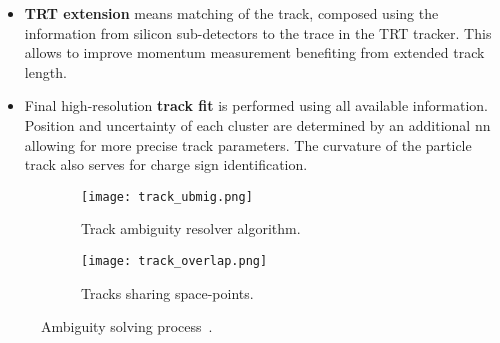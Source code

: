 \begin{itemize}
  		\item \textbf{TRT extension} means matching of the track, composed using the information from silicon sub-detectors to the trace in the TRT tracker. This allows to improve momentum measurement benefiting from extended track length.
  		\item Final high-resolution \textbf{track fit} is performed using all available information. Position and uncertainty of each cluster are determined by an additional \gls{nn} allowing for more precise track parameters. The curvature of the particle track also serves for charge sign identification.
  	\end{itemize}
  		\begin{figure}[htbp]
  		\begin{subfigure}[t]{0.65\textwidth}
  			\texttt{[image: track\_ubmig.png]}
  			\caption[Side view]{Track ambiguity resolver algorithm.}
  			\label{fig::tr_ambig}
  		\end{subfigure}
  		\hfill
  		\begin{subfigure}[t]{0.33\textwidth} 
  			\texttt{[image: track\_overlap.png]}
  			\caption[Share]{Tracks sharing space-points.}
  			\label{fig::tr_overlap}
  		\end{subfigure}
  		\caption{Ambiguity solving process~\cite{ATLAS:track2}.}
  		\label{fig::tr_resol}
  	\end{figure}

